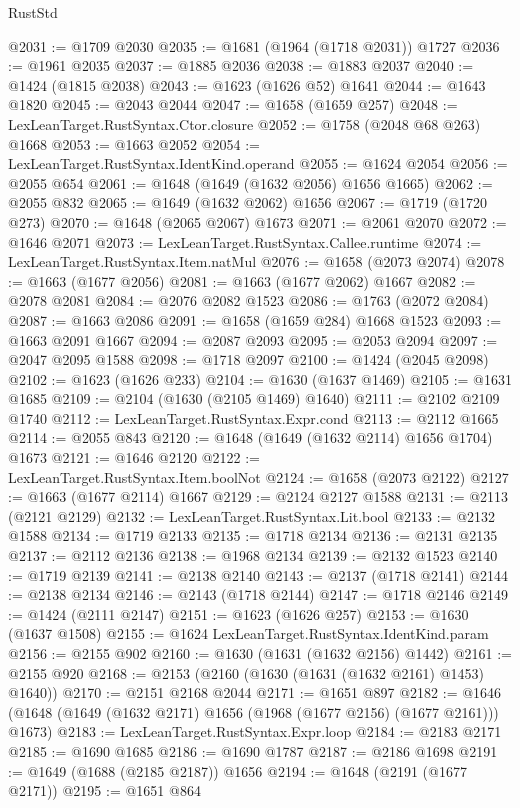 \begin{lexlean}{RustStd}
\begin{coremodule}
@2031 := @1709 @2030
@2035 := @1681 (@1964 (@1718 @2031)) @1727
@2036 := @1961 @2035
@2037 := @1885 @2036
@2038 := @1883 @2037
@2040 := @1424 (@1815 @2038)
@2043 := @1623 (@1626 @52) @1641
@2044 := @1643 @1820
@2045 := @2043 @2044
@2047 := @1658 (@1659 @257)
@2048 := LexLeanTarget.RustSyntax.Ctor.closure
@2052 := @1758 (@2048 @68 @263) @1668
@2053 := @1663 @2052
@2054 := LexLeanTarget.RustSyntax.IdentKind.operand
@2055 := @1624 @2054
@2056 := @2055 @654
@2061 := @1648 (@1649 (@1632 @2056) @1656 @1665)
@2062 := @2055 @832
@2065 := @1649 (@1632 @2062) @1656
@2067 := @1719 (@1720 @273)
@2070 := @1648 (@2065 @2067) @1673
@2071 := @2061 @2070
@2072 := @1646 @2071
@2073 := LexLeanTarget.RustSyntax.Callee.runtime
@2074 := LexLeanTarget.RustSyntax.Item.natMul
@2076 := @1658 (@2073 @2074)
@2078 := @1663 (@1677 @2056)
@2081 := @1663 (@1677 @2062) @1667
@2082 := @2078 @2081
@2084 := @2076 @2082 @1523
@2086 := @1763 (@2072 @2084)
@2087 := @1663 @2086
@2091 := @1658 (@1659 @284) @1668 @1523
@2093 := @1663 @2091 @1667
@2094 := @2087 @2093
@2095 := @2053 @2094
@2097 := @2047 @2095 @1588
@2098 := @1718 @2097
@2100 := @1424 (@2045 @2098)
@2102 := @1623 (@1626 @233)
@2104 := @1630 (@1637 @1469)
@2105 := @1631 @1685
@2109 := @2104 (@1630 (@2105 @1469) @1640)
@2111 := @2102 @2109 @1740
@2112 := LexLeanTarget.RustSyntax.Expr.cond
@2113 := @2112 @1665
@2114 := @2055 @843
@2120 := @1648 (@1649 (@1632 @2114) @1656 @1704) @1673
@2121 := @1646 @2120
@2122 := LexLeanTarget.RustSyntax.Item.boolNot
@2124 := @1658 (@2073 @2122)
@2127 := @1663 (@1677 @2114) @1667
@2129 := @2124 @2127 @1588
@2131 := @2113 (@2121 @2129)
@2132 := LexLeanTarget.RustSyntax.Lit.bool
@2133 := @2132 @1588
@2134 := @1719 @2133
@2135 := @1718 @2134
@2136 := @2131 @2135
@2137 := @2112 @2136
@2138 := @1968 @2134
@2139 := @2132 @1523
@2140 := @1719 @2139
@2141 := @2138 @2140
@2143 := @2137 (@1718 @2141)
@2144 := @2138 @2134
@2146 := @2143 (@1718 @2144)
@2147 := @1718 @2146
@2149 := @1424 (@2111 @2147)
@2151 := @1623 (@1626 @257)
@2153 := @1630 (@1637 @1508)
@2155 := @1624 LexLeanTarget.RustSyntax.IdentKind.param
@2156 := @2155 @902
@2160 := @1630 (@1631 (@1632 @2156) @1442)
@2161 := @2155 @920
@2168 := @2153 (@2160 (@1630 (@1631 (@1632 @2161) @1453) @1640))
@2170 := @2151 @2168 @2044
@2171 := @1651 @897
@2182 := @1646 (@1648 (@1649 (@1632 @2171) @1656 (@1968 (@1677 @2156) (@1677 @2161))) @1673)
@2183 := LexLeanTarget.RustSyntax.Expr.loop
@2184 := @2183 @2171
@2185 := @1690 @1685
@2186 := @1690 @1787
@2187 := @2186 @1698
@2191 := @1649 (@1688 (@2185 @2187)) @1656
@2194 := @1648 (@2191 (@1677 @2171))
@2195 := @1651 @864

\end{coremodule}
\end{lexlean}
